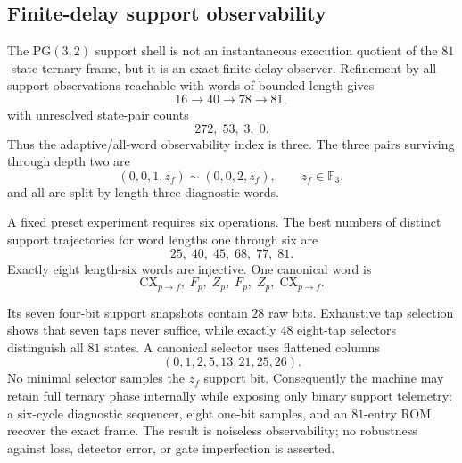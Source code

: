 \subsection{Finite-delay support observability}
\label{sec:bt2825-bt2828-support-observer}

The PG$(3,2)$ support shell is not an instantaneous execution quotient of the
$81$-state ternary frame, but it is an exact finite-delay observer.  Refinement by all
support observations reachable with words of bounded length gives
\[
 \boxed{16\longrightarrow40\longrightarrow78\longrightarrow81},
\]
with unresolved state-pair counts
\[
 \boxed{272,\;53,\;3,\;0}.
\]
Thus the adaptive/all-word observability index is three.  The three pairs surviving
through depth two are
\[
 (0,0,1,z_f)\sim(0,0,2,z_f),\qquad z_f\in\mathbb F_3,
\]
and all are split by length-three diagnostic words.

A fixed preset experiment requires six operations.  The best numbers of distinct support
trajectories for word lengths one through six are
\[
 \boxed{25,\;40,\;45,\;68,\;77,\;81}.
\]
Exactly eight length-six words are injective.  One canonical word is
\[
 \boxed{
 \mathrm{CX}_{p\to f},\;F_p,\;Z_p,\;F_p,\;Z_p,\;\mathrm{CX}_{p\to f}
 }.
\]

Its seven four-bit support snapshots contain $28$ raw bits.  Exhaustive tap selection
shows that seven taps never suffice, while exactly $48$ eight-tap selectors distinguish
all $81$ states.  A canonical selector uses flattened columns
\[
 \boxed{(0,1,2,5,13,21,25,26)}.
\]
No minimal selector samples the $z_f$ support bit.  Consequently the machine may retain
full ternary phase internally while exposing only binary support telemetry: a six-cycle
diagnostic sequencer, eight one-bit samples, and an $81$-entry ROM recover the exact frame.
The result is noiseless observability; no robustness against loss, detector error, or gate
imperfection is asserted.
